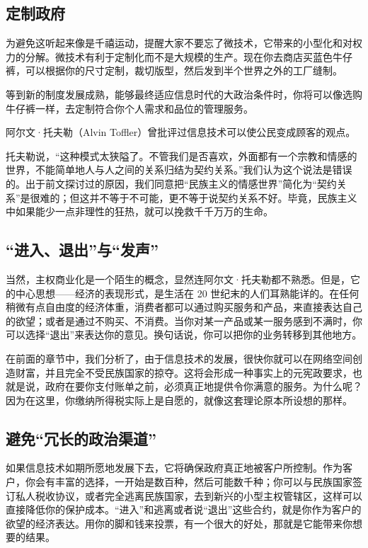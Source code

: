 \subsection{定制政府}
为避免这听起来像是千禧运动，提醒大家不要忘了微技术，它带来的小型化和对权力的分解。微技术有利于定制化而不是大规模的生产。现在你去商店买蓝色牛仔裤，可以根据你的尺寸定制，裁切版型，然后发到半个世界之外的工厂缝制。

等到新的制度发展成熟，能够最终适应信息时代的大政治条件时，你将可以像选购牛仔裤一样，去定制符合你个人需求和品位的管理服务。

阿尔文·托夫勒（Alvin Toffler）曾批评过信息技术可以使公民变成顾客的观点。

托夫勒说，“这种模式太狭隘了。不管我们是否喜欢，外面都有一个宗教和情感的世界，不能简单地人与人之间的关系归结为契约关系。”我们认为这个说法是错误的。出于前文探讨过的原因，我们同意把“民族主义的情感世界”简化为“契约关系”是很难的；但这并不等于不可能，更不等于说契约关系不好。毕竟，民族主义中如果能少一点非理性的狂热，就可以挽救千千万万的生命。

\subsection{“进入、退出”与“发声”}
当然，主权商业化是一个陌生的概念，显然连阿尔文·托夫勒都不熟悉。但是，它的中心思想——经济的表现形式，是生活在 20 世纪末的人们耳熟能详的。在任何稍微有点自由度的经济体重，消费者都可以通过购买服务和产品，来直接表达自己的欲望；或者是通过不购买、不消费。当你对某一产品或某一服务感到不满时，你可以选择“退出”来表达你的意见。换句话说，你可以把你的业务转移到其他地方。

在前面的章节中，我们分析了，由于信息技术的发展，很快你就可以在网络空间创造财富，并且完全不受民族国家的掠夺。这将会形成一种事实上的元宪政要求，也就是说，政府在要你支付账单之前，必须真正地提供令你满意的服务。为什么呢？因为在这里，你缴纳所得税实际上是自愿的，就像这套理论原本所设想的那样。

\subsection{避免“冗长的政治渠道”}
如果信息技术如期所愿地发展下去，它将确保政府真正地被客户所控制。作为客户，你会有丰富的选择，一开始是数百种，然后可能数千种；你可以与民族国家签订私人税收协议，或者完全逃离民族国家，去到新兴的小型主权管辖区，这样可以直接降低你的保护成本。“进入”和逃离或者说“退出”这些合约，就是你作为客户的欲望的经济表达。用你的脚和钱来投票，有一个很大的好处，那就是它能带来你想要的结果。

